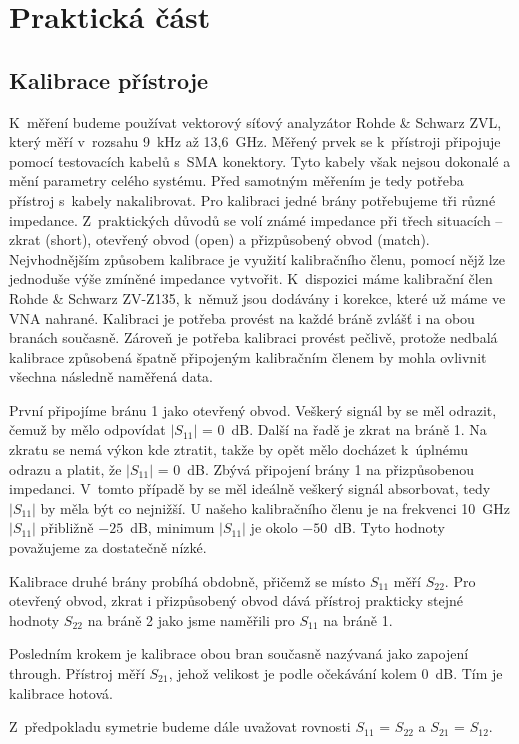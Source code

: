 \documentclass{protokol}
\begin{document}
\section{Praktická část}
\subsection{Kalibrace přístroje}
K~měření budeme používat vektorový síťový analyzátor Rohde \& Schwarz ZVL,
který měří v~rozsahu 9~kHz až 13,6~GHz.
Měřený prvek se k~přístroji připojuje pomocí testovacích kabelů s~SMA konektory.
Tyto kabely však nejsou dokonalé a mění parametry celého systému.
Před samotným měřením je tedy potřeba přístroj s~kabely nakalibrovat.
Pro kalibraci jedné brány potřebujeme tři různé impedance.
Z~praktických důvodů se volí známé impedance při třech situacích -- zkrat (short),
otevřený obvod (open) a přizpůsobený obvod (match).
Nejvhodnějším způsobem kalibrace je využití kalibračního členu,
pomocí nějž lze jednoduše výše zmíněné impedance vytvořit.
K~dispozici máme kalibrační člen Rohde \& Schwarz ZV-Z135,
k~němuž jsou dodávány i korekce, které už máme ve VNA nahrané.
Kalibraci je potřeba provést na každé bráně zvlášť i na obou branách současně.
Zároveň je potřeba kalibraci provést pečlivě,
protože nedbalá kalibrace způsobená špatně připojeným kalibračním členem
by mohla ovlivnit všechna následně naměřená data.

První připojíme bránu 1 jako otevřený obvod.
Veškerý signál by se měl odrazit, čemuž by mělo odpovídat $|S_{11}|$ = 0~dB.
Další na řadě je zkrat na bráně 1.
Na zkratu se nemá výkon kde ztratit,
takže by opět mělo docházet k~úplnému odrazu a platit, že $|S_{11}|$ = 0~dB.
Zbývá připojení brány 1 na přizpůsobenou impedanci.
V~tomto případě by se měl ideálně veškerý signál absorbovat,
tedy $|S_{11}|$ by měla být co nejnižší.
U našeho kalibračního členu je na frekvenci 10~GHz $|S_{11}|$ přibližně $-25$~dB,
minimum $|S_{11}|$ je okolo $-50$~dB. Tyto hodnoty považujeme
za dostatečně nízké.

Kalibrace druhé brány probíhá obdobně,
přičemž se místo $S_{11}$ měří $S_{22}$.
Pro otevřený obvod, zkrat i přizpůsobený obvod dává přístroj prakticky
stejné hodnoty $S_{22}$ na bráně 2 jako jsme naměřili pro $S_{11}$ na bráně 1.

Posledním krokem je kalibrace obou bran současně nazývaná
jako zapojení through.
Přístroj měří $S_{21}$, jehož velikost je podle očekávání kolem 0~dB.
Tím je kalibrace hotová.

Z~předpokladu symetrie budeme dále uvažovat rovnosti
$S_{11}$ = $S_{22}$ a $S_{21}$ = $S_{12}$.
\end{document}

